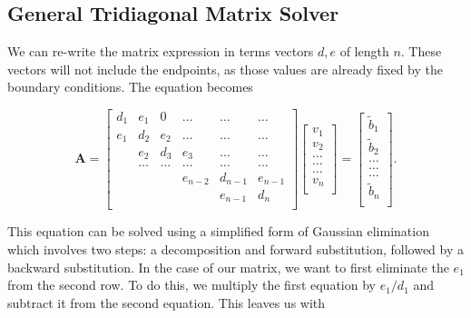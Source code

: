 \documentclass[%
oneside,                 %
final,                   %
10pt]{article}
\begin{document}
\subsection{General Tridiagonal Matrix Solver}

We can re-write the matrix expression in terms vectors $d,e$ of length $n$.  These vectors will not include the endpoints, as those values are already fixed by the boundary conditions. The equation becomes

\[
    \mathbf{A} = \begin{bmatrix}
                           d_1& e_1 & 0 &\dots   & \dots &\dots \\
                           e_1 & d_2 & e_2 &\dots &\dots &\dots \\
                           & e_2 & d_3 & e_3 & \dots & \dots \\
                           & \dots   & \dots &\dots   &\dots & \dots \\
                           &   &  &e_{n-2}  &d_{n-1}& e_{n-1} \\
                           &    &  &   &e_{n-1} & d_n \\
                      \end{bmatrix}\begin{bmatrix}
                           v_1\\
                           v_2\\
                           \dots \\
                          \dots  \\
                          \dots \\
                           v_n\\
                      \end{bmatrix}
  =\begin{bmatrix}
                           \tilde{b}_1\\
                           \tilde{b}_2\\
                           \dots \\
                           \dots \\
                          \dots \\
                           \tilde{b}_n\\
                      \end{bmatrix}.
\]

This equation can be solved using a simplified form of Gaussian elimination which involves two steps: a decomposition and forward substitution, followed by a backward substitution.  In the case of our matrix, we want to first eliminate the $e_1$ from the second row.  To do this, we multiply the first equation by $e_1/d_1$ and subtract it from the second equation.  This leaves us with
\end{document}
